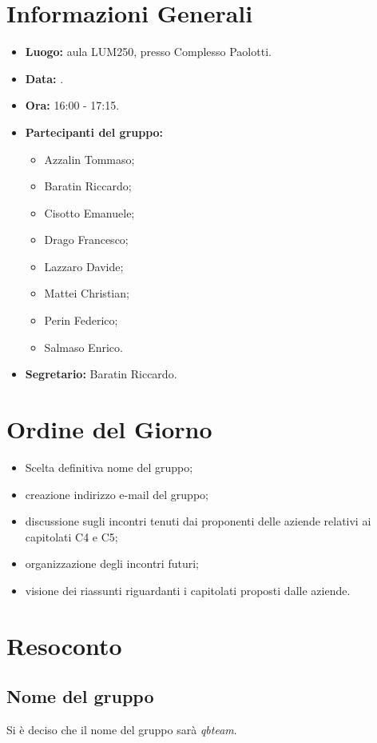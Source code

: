 \section{Informazioni Generali}
\begin{itemize}
\item \textbf{Luogo:} aula LUM250, presso Complesso Paolotti.
\item \textbf{Data:} \Data.
\item \textbf{Ora:} 16:00 - 17:15.
\item \textbf{Partecipanti del gruppo:}
	\begin{itemize}
		\item Azzalin Tommaso; 
		\item Baratin Riccardo;
		\item Cisotto Emanuele; 
		\item Drago Francesco;
		\item Lazzaro Davide;
		\item Mattei Christian;
		\item Perin Federico;
		\item Salmaso Enrico.
	\end{itemize} 
\item \textbf{Segretario:} Baratin Riccardo.
\end{itemize}


\section{Ordine del Giorno}
\begin{itemize}
	\item Scelta definitiva nome del gruppo;
	\item creazione indirizzo e-mail del gruppo;
	\item discussione sugli incontri tenuti dai proponenti delle aziende relativi ai capitolati C4 e C5;
	\item organizzazione degli incontri futuri;
	\item visione dei riassunti riguardanti i capitolati proposti dalle aziende.
\end{itemize}


\section{Resoconto}
\subsection{Nome del gruppo}
Si è deciso che il nome del gruppo sarà \textit{qbteam}.

